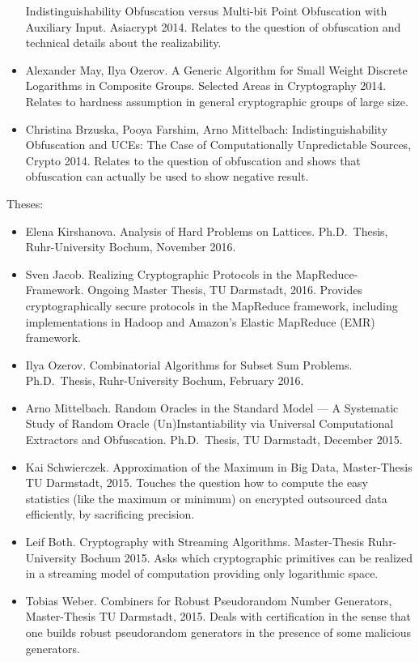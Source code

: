 \begin{itemize}
Indistinguishability Obfuscation versus Multi-bit Point Obfuscation with Auxiliary Input. Asiacrypt 2014. Relates to the question of obfuscation and technical details about the realizability.
%
\item Alexander May, Ilya Ozerov. A Generic Algorithm for Small Weight Discrete Logarithms in Composite Groups. Selected Areas in Cryptography 2014. Relates to hardness assumption in general cryptographic groups of large size.
%
\item 
Christina Brzuska, Pooya Farshim, Arno Mittelbach:
Indistinguishability Obfuscation and UCEs: The Case of Computationally Unpredictable Sources, Crypto 2014. Relates to the question of obfuscation and shows that obfuscation can actually be used to show negative result.
%
\end{itemize}
%

\noindent
Theses:
\begin{itemize}
\item Elena Kirshanova. Analysis of Hard Problems on Lattices. Ph.D.~Thesis, Ruhr-University Bochum, November 2016.
%
\item Sven Jacob. Realizing Cryptographic Protocols in the MapReduce-Framework. Ongoing Master Thesis, TU Darmstadt, 2016. Provides cryptographically secure protocols in the MapReduce framework, including implementations in Hadoop and Amazon's Elastic MapReduce (EMR) framework.
%
\item Ilya Ozerov. Combinatorial Algorithms for Subset Sum Problems. Ph.D.~Thesis, Ruhr-University Bochum, February 2016.
%
\item Arno Mittelbach. Random Oracles in the Standard Model --- A Systematic Study of Random Oracle (Un)Instantiability via Universal Computational Extractors and Obfuscation. Ph.D.~Thesis, TU Darmstadt, December 2015.
%
\item Kai Schwierczek. Approximation of the Maximum in Big Data, Master-Thesis TU Darmstadt, 2015. Touches the question how to compute the easy statistics (like the maximum or minimum) on encrypted outsourced data efficiently, by sacrificing precision.
%
\item Leif Both. Cryptography with Streaming Algorithms. Master-Thesis Ruhr-University Bochum 2015. Asks which cryptographic primitives can be realized in a streaming model of computation providing only logarithmic space.

%
\item Tobias Weber. Combiners for Robust Pseudorandom Number Generators, Master-Thesis TU Darmstadt, 2015. Deals with certification in the sense that one builds robust pseudorandom generators in the presence of some malicious generators.
%
\end{itemize}

